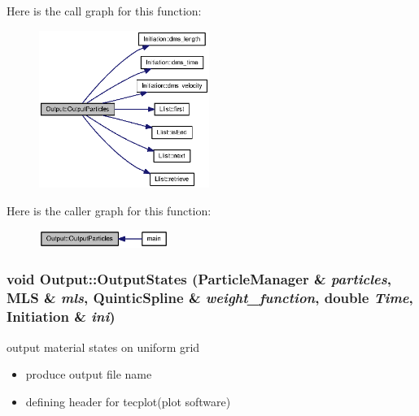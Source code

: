 Here is the call graph for this function:\nopagebreak
\begin{figure}[H]
\begin{center}
\leavevmode
\includegraphics[width=157pt]{classOutput_f9e8b1a0aa456c01c69f7b3c7ee2649a_cgraph}
\end{center}
\end{figure}


Here is the caller graph for this function:\nopagebreak
\begin{figure}[H]
\begin{center}
\leavevmode
\includegraphics[width=119pt]{classOutput_f9e8b1a0aa456c01c69f7b3c7ee2649a_icgraph}
\end{center}
\end{figure}
\hypertarget{classOutput_2b41cacb61eecf10cbaca6bebb3e6316}{
\subsubsection[{OutputStates}]{\setlength{\rightskip}{0pt plus 5cm}void Output::OutputStates ({\bf ParticleManager} \& {\em particles}, \/  {\bf MLS} \& {\em mls}, \/  {\bf QuinticSpline} \& {\em weight\_\-function}, \/  double {\em Time}, \/  {\bf Initiation} \& {\em ini})}}
\label{classOutput_2b41cacb61eecf10cbaca6bebb3e6316}


output material states on uniform grid 



\begin{itemize}
\item produce output file name\end{itemize}


\begin{itemize}
\item defining header for tecplot(plot software)\end{itemize}


